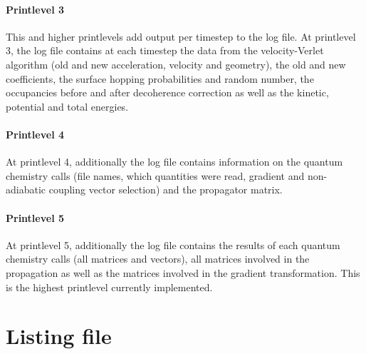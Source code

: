 \documentclass[a4paper,11pt,DIV=15,openany,twoside=false]{scrbook}
\begin{document}
\paragraph{Printlevel 3}

This and higher printlevels add output per timestep to the log file. At printlevel 3, the log file contains at each timestep the data from the velocity-Verlet algorithm (old and new acceleration, velocity and geometry), the old and new coefficients, the surface hopping probabilities and random number, the occupancies before and after decoherence correction as well as the kinetic, potential and total energies.

\paragraph{Printlevel 4}

At printlevel 4, additionally the log file contains information on the quantum chemistry calls (file names, which quantities were read, gradient and non-adiabatic coupling vector selection) and the propagator matrix.

\paragraph{Printlevel 5}

At printlevel 5, additionally the log file contains the results of each quantum chemistry calls (all matrices and vectors), all matrices involved in the propagation as well as the matrices involved in the gradient transformation. This is the highest printlevel currently implemented.

\section{Listing file}\label{sec:lisfile}
\end{document}
